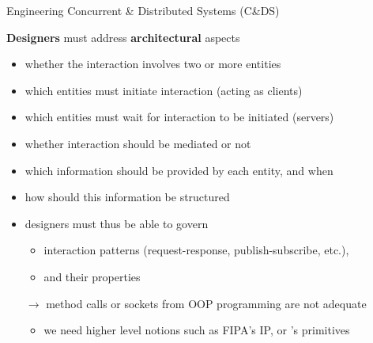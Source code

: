 \documentclass[presentation]{beamer}\mode<presentation>{\usetheme{AMSCesenaPurpleAndGold}}
\begin{document}
\begin{frame}[c,allowframebreaks]{Engineering Concurrent \& Distributed Systems (C\&DS)}
	\framebreak

	\begin{block}{\textbf{Designers} must address \textbf{architectural} aspects}
		\begin{itemize}
			\item whether the interaction involves \alert{two or more} entities
			\item which entities must \alert{initiate} interaction (acting as clients)
			\item which entities must \alert{wait} for interaction to be initiated (servers)
			\item whether interaction should be \alert{mediated} or not
			\item which information should be provided by each entity, and \alert{when}
			\item how should this information be \alert{structured}
		\end{itemize}
	\end{block}

	\bigskip

	\begin{itemize}
		\item designers must thus be able to govern
		\begin{itemize}
			\item interaction patterns (request-response, publish-subscribe, etc.),
			\item and their properties
		\end{itemize}

		\bigskip

		\item[$\rightarrow$] method calls or sockets from OOP programming are not adequate
		\begin{itemize}
			\item we need higher level notions such as \alert{FIPA's IP}, or \alert{\linda{}'s primitives}
		\end{itemize}
	\end{itemize}

	\framebreak


\end{frame}
\end{document}
